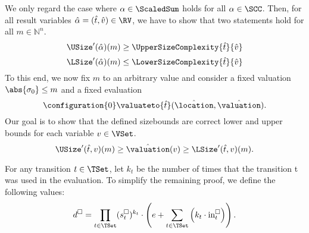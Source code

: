 We only regard the case where $\alpha \in \ScaledSum$ holds for all $\alpha \in \SCC$.
Then, for all result variables $\hat{\alpha} = (\hat{t}, \hat{v}) \in \RV$, we have to show that two statements hold for all $m \in \mathbb{N}^n$.
\[ \USize'(\hat{\alpha})(m) \geq \UpperSizeComplexity{\hat{t}}{\hat{v}} \]
\[ \LSize'(\hat{\alpha})(m) \leq \LowerSizeComplexity{\hat{t}}{\hat{v}} \]
To this end, we now fix $m$ to an arbitrary value and consider a fixed valuation $\abs{\sigma_0} \leq m$ and a fixed evaluation
\[ \configuration{0} \valuateto{\hat{t}} (\hat{\location}, \hat{\valuation}). \]
Our goal is to show that the defined sizebounds are correct lower and upper bounds for each variable $v \in \VSet$.
\begin{equation} \label{eq:sizebound_target}
  \USize'(\hat{t}, v)(m) \geq \hat{\valuation}(v) \geq \LSize'(\hat{t}, v)(m).
\end{equation}

For any transition $t \in \TSet$, let $k_t$ be the number of times that the transition t was used in the evaluation.
To simplify the remaining proof, we define the following values:
\[ d^\square = \prod_{t \in \TSet} (s^\square_t)^{k_t} \cdot \left( e + \sum_{t \in \TSet} \left( k_t \cdot \text{in}^\square_t \right) \right). \]

